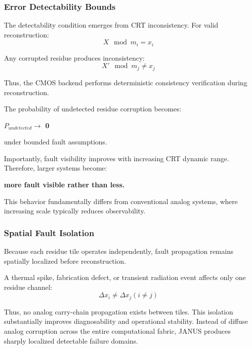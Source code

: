\documentclass[journal]{IEEEtran}
\begin{document}
\subsubsection{\textbf{Error Detectability Bounds}}

The detectability condition emerges from CRT inconsistency.
For valid reconstruction:
\begin{equation}
X \mod m_i = x_i
\end{equation}

Any corrupted residue produces inconsistency:
\begin{equation}
X ' \mod m_j \neq  x_j 
\end{equation}

Thus, the CMOS backend performs deterministic consistency verification during reconstruction.

The probability of undetected residue corruption becomes:
\begin{center}
\textbf{$P_{undetected} \rightarrow$ 0}
\end{center}
under bounded fault assumptions.

Importantly, fault visibility improves with increasing CRT dynamic range.
Therefore, larger systems become:
\begin{center}
\textbf{more fault visible rather than less.}
\end{center}

This behavior fundamentally differs from conventional analog systems, where increasing scale typically reduces observability.

\subsubsection{\textbf{Spatial Fault Isolation}}

Because each residue tile operates independently, fault propagation remains spatially localized before reconstruction.

A thermal spike, fabrication defect, or transient radiation event affects only one residue channel:
\begin{equation}
\Delta x_i \neq  \Delta x_j (i \neq  j)
\end{equation}

Thus, no analog carry-chain propagation exists between tiles. This isolation substantially improves diagnosability and operational stability. Instead of diffuse analog corruption across the entire computational fabric, JANUS produces sharply localized detectable failure domains.
\end{document}
